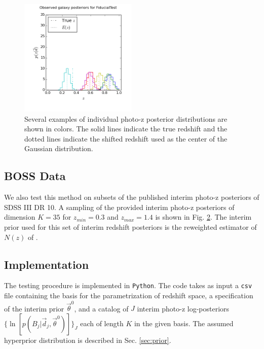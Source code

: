 \documentclass[preprint]{aastex}
\begin{document}
\begin{figure}
\includegraphics[width=0.5\textwidth]{null/samplepzs.png}
\caption{Several examples of individual photo-z posterior distributions are 
shown in colors.  The solid lines indicate the true redshift and the dotted 
lines indicate the shifted redshift used as the center of the Gaussian 
distribution.}
\label{fig:nullpzs}
\end{figure}

\subsection{BOSS Data}
\label{sec:data}

We also test this method on subsets of the published interim photo-z posteriors 
of SDSS III DR 10.  A sampling of the provided interim photo-z posteriors of 
dimension $K=35$ for $z_{min}=0.3$ and $z_{max}=1.4$ is shown in Fig. 
\ref{fig:datapzs}.  The interim prior used for this set of interim redshift 
posteriors is the reweighted estimator of $N(z)$ of \citet{Sheldon2012}.

\begin{figure}
\caption{}
\label{fig:datapzs}
\end{figure}

\clearpage
\subsection{Implementation}
\label{sec:mcmc}

The testing procedure is implemented in \texttt{Python}.  The code takes as 
input a \texttt{csv} file containing the basis for the parametrization of 
redshift space, a specification of the interim prior $\vec{\theta}^{0}$, and a 
catalog of $J$ interim photo-z log-posteriors 
$\{\ln[p(B_{j}|\vec{d}_{j},\vec{\theta}^{0})]\}_{J}$ each of length $K$ in the 
given basis.  The assumed hyperprior distribution is described in Sec. 
\ref{sec:prior}.
\end{document}
